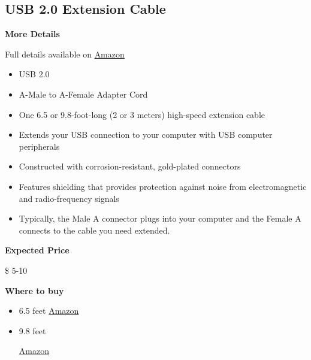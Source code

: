 \subsection{USB 2.0 Extension Cable}
\label{sec:equipment::accessories::usbextend}

\begin{gram}
\label{grm:equipment::accessories::usbextend}
\textbf{More Details}

Full details available on \href{https://www.amazon.com/AmazonBasics-Extension-Cable-Male-Female/dp/B00NH11PEY/ref=sr_1_3?crid=37GCZPQHYO54W&keywords=usb+extension+cable&qid=1582900847&s=electronics&sprefix=usb+ext,electronics,164&sr=1-3}{Amazon}

\begin{itemize}
\item USB 2.0
\item A-Male to A-Female Adapter Cord
\item  One 6.5 or 9.8-foot-long (2 or 3 meters) high-speed extension cable
\item Extends your USB connection to your computer with USB computer peripherals
\item 
Constructed with corrosion-resistant, gold-plated connectors
\item Features shielding that provides protection against noise from electromagnetic and radio-frequency signals
\item Typically, the Male A connector plugs into your computer and the Female A connects to the cable you need extended. 

\end{itemize}

\textbf{Expected Price}

\$ 5-10

\textbf{Where to buy}

\begin{itemize}
\item 
6.5 feet
\href{https://www.amazon.com/AmazonBasics-Extension-Cable-Male-Female/dp/B00NH136G}{Amazon}

\item
9.8 feet

\href{https://www.amazon.com/AmazonBasics-Extension-Cable-Male-Female/dp/B00NH11PEY/ref=sr_1_3?crid=37GCZPQHYO54W&keywords=usb+extension+cable&qid=1582900847&s=electronics&sprefix=usb+ext,electronics,164&sr=1-3}{Amazon}
\end{itemize}
\end{gram}

